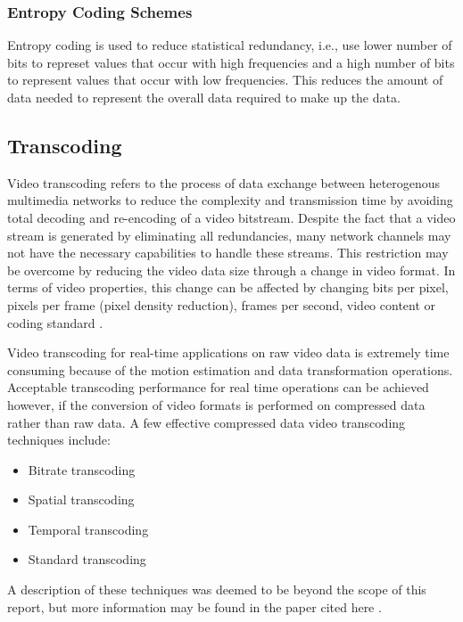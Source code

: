 \documentclass[letterpaper,12pt,titlepage,oneside,final]{report}
\begin{document}
            \subsubsection {Entropy Coding Schemes}
                Entropy coding is used to reduce statistical redundancy, i.e., use lower number of bits to represet values that occur with high frequencies and a high number of bits to represent values that occur with low frequencies. This reduces the amount of data needed to represent the overall data required to make up the data.

        \subsection{Transcoding}
            Video transcoding refers to the process of data exchange between heterogenous multimedia networks to reduce the complexity and transmission time by avoiding total decoding and re-encoding of a video bitstream. Despite the fact that a video stream is generated by eliminating all redundancies, many network channels may not have the necessary capabilities to handle these streams. This restriction may be overcome by reducing the video data size through a change in video format. In terms of video properties, this change can be affected by changing bits per pixel, pixels per frame (pixel density reduction), frames per second, video content or coding standard \cite{Choupani}.

            Video transcoding for real-time applications on raw video data is extremely time consuming because of the motion estimation and data transformation operations. Acceptable transcoding performance for real time operations can be achieved however, if the conversion of video formats is performed on compressed data rather than raw data. A few effective compressed data video transcoding techniques include:
            \begin{itemize}
                \item{Bitrate transcoding}
                \item{Spatial transcoding}
                \item{Temporal transcoding}
                \item{Standard transcoding}
            \end{itemize}
            A description of these techniques was deemed to be beyond the scope of this report, but more information may be found in the paper cited here \cite{Choupani}.
\end{document}
